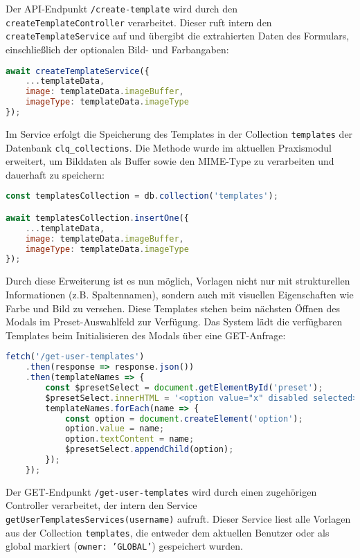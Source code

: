 Der API-Endpunkt \texttt{/create-template} wird durch den \texttt{createTemplateController} verarbeitet.
Dieser ruft intern den \texttt{createTemplateService} auf und übergibt die extrahierten Daten des Formulars, einschließlich der optionalen Bild- und Farbangaben:

\begin{lstlisting}[language=JavaScript, caption=Service-Aufruf im Controller]
await createTemplateService({
    ...templateData,
    image: templateData.imageBuffer,
    imageType: templateData.imageType
});
\end{lstlisting}

Im Service erfolgt die Speicherung des Templates in der Collection \texttt{templates} der Datenbank \texttt{clq\_collections}.
Die Methode wurde im aktuellen Praxismodul erweitert, um Bilddaten als Buffer sowie den MIME-Type zu verarbeiten und dauerhaft zu speichern:

\begin{lstlisting}[language=JavaScript, caption=Speicherung im createTemplateService]
const templatesCollection = db.collection('templates');

await templatesCollection.insertOne({
    ...templateData,
    image: templateData.imageBuffer,
    imageType: templateData.imageType
});
\end{lstlisting}

Durch diese Erweiterung ist es nun möglich, Vorlagen nicht nur mit strukturellen Informationen (z.B. Spaltennamen), sondern auch mit visuellen Eigenschaften wie Farbe und Bild zu versehen.
Diese Templates stehen beim nächsten Öffnen des Modals im Preset-Auswahlfeld zur Verfügung.
Das System lädt die verfügbaren Templates beim Initialisieren des Modals über eine GET-Anfrage:

\begin{lstlisting}[language=JavaScript, caption=Presets beim Laden des Modals laden]
fetch('/get-user-templates')
    .then(response => response.json())
    .then(templateNames => {
        const $presetSelect = document.getElementById('preset');
        $presetSelect.innerHTML = '<option value="x" disabled selected>Select preset...</option>';
        templateNames.forEach(name => {
            const option = document.createElement('option');
            option.value = name;
            option.textContent = name;
            $presetSelect.appendChild(option);
        });
    });
\end{lstlisting}

Der GET-Endpunkt \texttt{/get-user-templates} wird durch einen zugehörigen Controller verarbeitet, der intern den Service \texttt{getUserTemplatesServices(username)} aufruft.
Dieser Service liest alle Vorlagen aus der Collection \texttt{templates}, die entweder dem aktuellen Benutzer oder als global markiert (\texttt{owner: 'GLOBAL'}) gespeichert wurden.

